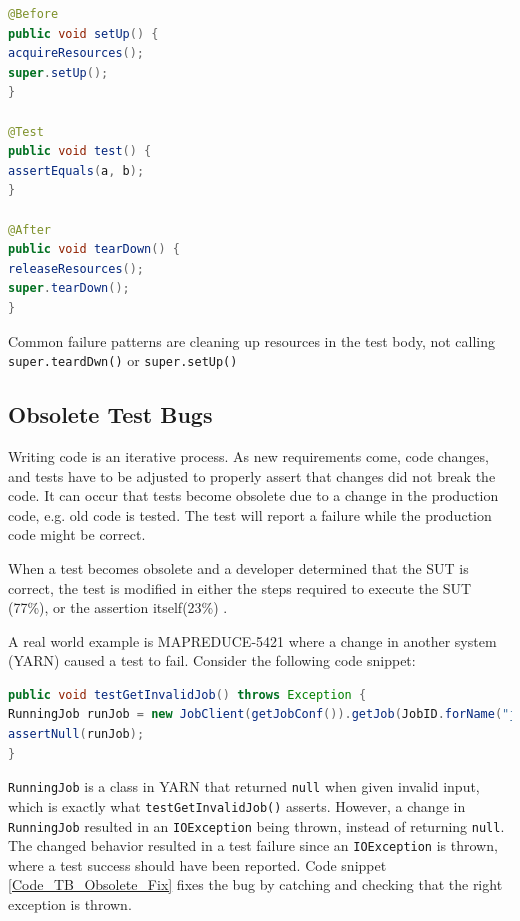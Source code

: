 \documentclass{uvamscse}
\begin{document}
\begin{lstlisting}[language=java, caption=Setup and Teardown without side-effects, label=Code_TB_RH_dep2]
@Before
public void setUp() {
acquireResources();
super.setUp();
}

@Test
public void test() {
assertEquals(a, b);
}

@After
public void tearDown() {
releaseResources();
super.tearDown();
}
\end{lstlisting}

Common failure patterns are cleaning up resources in the test body, not calling \texttt{super.teardDwn()} or \texttt{super.setUp()}

\subsection{Obsolete Test Bugs}
\label{sec:obsoleteTB}
Writing code is an iterative process. As new requirements come, code changes, and tests have to be adjusted to properly assert that changes did not break the code. It can occur that tests become obsolete due to a change in the production code, e.g. old code is tested. The test will report a failure while the production code might be correct. 

When a test becomes obsolete and a developer determined that the SUT is correct, the test is modified in either the steps required to execute the SUT (77\%), or the assertion itself(23\%) \cite{vahabzadeh2015empirical}. 

A real world example is MAPREDUCE-5421 where a change in another system (YARN) caused a test to fail. Consider the following code snippet:

\begin{lstlisting}[language=java, caption=Obsolete TB, label=Code_TB_Obsolete]
public void testGetInvalidJob() throws Exception {
RunningJob runJob = new JobClient(getJobConf()).getJob(JobID.forName("job_0_0"));
assertNull(runJob);
}
\end{lstlisting}

\texttt{RunningJob} is a class in YARN that returned \texttt{null} when given invalid input, which is exactly what \texttt{testGetInvalidJob()} asserts. However, a change in \texttt{RunningJob} resulted in an \texttt{IOException} being thrown, instead of returning \texttt{null}. The changed behavior resulted in a test failure since an \texttt{IOException} is thrown, where a test success should have been reported. Code snippet \ref{Code_TB_Obsolete_Fix} fixes the bug by catching and checking that the right exception is thrown.
\end{document}
